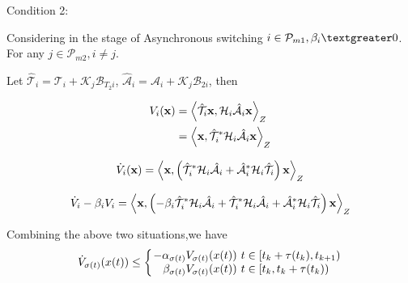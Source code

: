 \documentclass[twocolumn]{autart}    %
\begin{document}
\begin{pf}
Condition 2: 

Considering in the stage of Asynchronous switching $i \in \mathcal{P}_{m1},\beta_{i} \textgreater 0$. For any $j\in\mathcal{P}_{m2},i \ne j$. 

Let $\hat{\mathcal{T}}_{i} = \mathcal{T}_{i}+\mathcal{K}_{j}\mathcal{B}_{T_{2}i}$, $\hat{\mathcal{A}}_{i} = \mathcal{A}_{i}+\mathcal{K}_{j}\mathcal{B}_{2i}$, then

\begin{equation}
    \begin{aligned}
        \setlength{\arraycolsep}{0.9pt}
        V_{i}(\bold{x}) & = \left \langle \hat{\mathcal{T}}_{i}\bold{x},\mathcal{H}_{i}\hat{\mathcal{A}}_{i}\bold{x} \right \rangle_{Z}\\
& = \left \langle \bold{x},\hat{\mathcal{T}}_{i}^{*}\mathcal{H}_{i}\hat{\mathcal{A}}_{i}\bold{x} \right \rangle_{Z}
\end{aligned}
\end{equation}

\begin{equation}
    \begin{aligned}
        \setlength{\arraycolsep}{0.9pt}
        \dot{V}_{i}(\bold{x})  = \left \langle \bold{x},\left(\hat{\mathcal{T}}_{i}^{*}\mathcal{H}_{i}\hat{\mathcal{A}}_{i}+\hat{\mathcal{A}}_{i}^{*}\mathcal{H}_{i}\hat{\mathcal{T}}_{i}\right)\bold{x} \right \rangle_{Z}
\end{aligned}
\end{equation}

\begin{equation}
    \begin{aligned}
        \setlength{\arraycolsep}{0.9pt}
        \dot{V}_{i}-\beta_{i} V_{i}  = \left \langle \bold{x},\left(-\beta_{i}\hat{\mathcal{T}}_{i}^{*}\mathcal{H}_{i}\hat{\mathcal{A}}_{i}+\hat{\mathcal{T}}_{i}^{*}\mathcal{H}_{i}\hat{\mathcal{A}}_{i}+\hat{\mathcal{A}}_{i}^{*}\mathcal{H}_{i}\hat{\mathcal{T}}_{i}\right)\bold{x} \right \rangle_{Z}
\end{aligned}
\end{equation}



    Combining the above two situations,we have
    \begin{equation}
        \begin{aligned}
            \setlength{\arraycolsep}{0.9pt}
            \dot{V}_{\sigma(t)}(x(t)) \leq \left\{
                \begin{array}{rcl}
                -\alpha_{\sigma(t)}V_{\sigma(t)}(x(t))       &      & {t \in [t_{k}+\tau(t_{k}),t_{k+1})}\\
                \beta_{\sigma(t)}V_{\sigma(t)}(x(t))     &      & {t \in [t_{k},t_{k}+\tau(t_{k}))}
                \end{array}
            \right.
        \end{aligned}
    \end{equation}


\end{pf}
\end{document}
